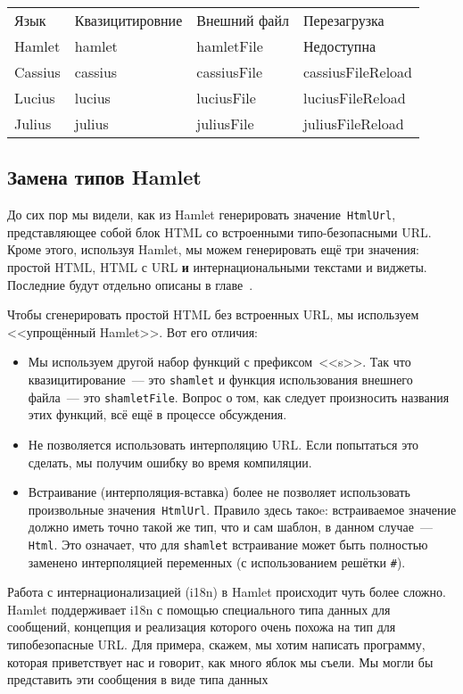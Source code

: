 \begin{tabular}{l l l l}
Язык    & Квазицитировние & Внешний файл & Перезагрузка \\
Hamlet  & hamlet           & hamletFile   & Недоступна    \\
Cassius & cassius          & cassiusFile  & cassiusFileReload \\
Lucius  & lucius           & luciusFile   & luciusFileReload \\
Julius  & julius           & juliusFile   & juliusFileReload \\
\end{tabular}

\subsection{Замена типов Hamlet}
До сих пор мы видели, как из Hamlet генерировать значение~\lstinline'HtmlUrl',
представляющее собой блок HTML со встроенными типо-безопасными URL. Кроме
этого, используя Hamlet, мы можем генерировать ещё три значения: простой HTML,
HTML с URL \textbf{и} интернациональными текстами и виджеты. Последние будут
отдельно описаны в главе~.

Чтобы сгенерировать простой HTML без встроенных URL, мы используем
<<упрощённый Hamlet>>. Вот его отличия:
\begin{itemize}
    \item Мы используем другой набор функций с префиксом~<<s>>. Так что
        квазицитирование~--- это \texttt{shamlet} и функция использования
        внешнего файла~--- это \texttt{shamletFile}. Вопрос о том, как следует
        произносить названия этих функций, всё ещё в процессе обсуждения.

    \item Не позволяется использовать интерполяцию URL. Если попытаться это
        сделать, мы получим ошибку во время компиляции.

    \item Встраивание (интерполяция-вставка) более не позволяет использовать
        произвольные значения~\lstinline'HtmlUrl'. Правило здесь такоe: встраиваемое
        значение должно иметь точно такой же тип, что и сам шаблон, в
        данном случае~--- \lstinline'Html'. Это означает, что для
        \texttt{shamlet} встраивание может быть полностью заменено
        интерполяцией переменных (с использованием решётки \texttt{\#}).
\end{itemize}

Работа с интернационализацией (i18n) в Hamlet происходит чуть более
сложно.  Hamlet поддерживает i18n с помощью специального типа данных
для сообщений, концепция и реализация которого очень похожа на тип для типобезопасные
URL. Для примера, скажем, мы хотим написать программу, которая приветствует нас
и говорит, как много яблок мы съели. Мы могли бы представить эти сообщения в
виде типа данных

